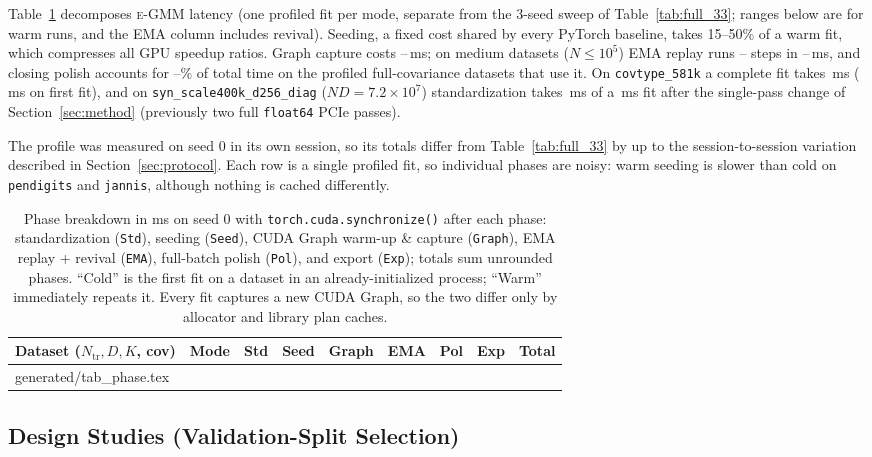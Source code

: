 \documentclass[10pt]{article} %
\makeatletter
\newcommand{\egmm}{\textsc{e-GMM}}
\newcommand{\gentable}[1]{\@@input generated/#1.tex }
\makeatother
\begin{document}
Table~\ref{tab:phase_breakdown} decomposes \egmm{} latency (one profiled fit per mode, separate from the 3-seed sweep of Table~\ref{tab:full_33}; ranges below are for warm runs, and the EMA column includes revival). Seeding, a fixed cost shared by every PyTorch baseline, takes 15--50\% of a warm fit, which compresses all GPU speedup ratios. Graph capture costs \rPhaseGraphMin--\rPhaseGraphMax\,ms; on medium datasets ($N \le 10^5$) EMA replay runs \rPhaseStepsMin--\rPhaseStepsMax{} steps in \rPhaseEMAMin--\rPhaseEMAMax\,ms, and closing polish accounts for \rPhasePolShareFullMin--\rPhasePolShareFullMax\% of total time on the profiled full-covariance datasets that use it. On \texttt{covtype\_581k} a complete fit takes \rPhaseCovWarm\,ms (\rPhaseCovCold\,ms on first fit), and on \texttt{syn\_scale400k\_d256\_diag} ($N D = 7.2 \times 10^7$) standardization takes \rPhaseDtwoStdWarm\,ms of a \rPhaseDtwoWarm\,ms fit after the single-pass change of Section~\ref{sec:method} (previously two full \texttt{float64} PCIe passes).

The profile was measured on seed 0 in its own session, so its totals differ from Table~\ref{tab:full_33} by up to the session-to-session variation described in Section~\ref{sec:protocol}. Each row is a single profiled fit, so individual phases are noisy: warm seeding is slower than cold on \texttt{pendigits} and \texttt{jannis}, although nothing is cached differently.
\begin{table}[h!]
\centering
\caption{Phase breakdown in ms on seed $0$ with \texttt{torch.cuda.synchronize()} after each phase: standardization (\texttt{Std}), seeding (\texttt{Seed}), CUDA Graph warm-up \& capture (\texttt{Graph}), EMA replay + revival (\texttt{EMA}), full-batch polish (\texttt{Pol}), and export (\texttt{Exp}); totals sum unrounded phases. ``Cold'' is the first fit on a dataset in an already-initialized process; ``Warm'' immediately repeats it. Every fit captures a new CUDA Graph, so the two differ only by allocator and library plan caches.}
\label{tab:phase_breakdown}
\small
\setlength{\tabcolsep}{5.0pt}
\begin{tabular}{llccccccc}
\toprule
\textbf{Dataset ($N_{\mathrm{tr}}, D, K$, cov)} & \textbf{Mode} & \textbf{Std} & \textbf{Seed} & \textbf{Graph} & \textbf{EMA} & \textbf{Pol} & \textbf{Exp} & \textbf{Total} \\
\midrule
\gentable{tab_phase}
\bottomrule
\end{tabular}
\end{table}

\subsection{Design Studies (Validation-Split Selection)}
\label{sec:design}
\end{document}
